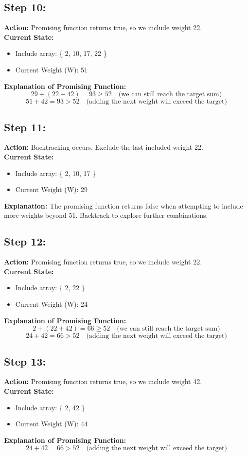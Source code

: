 \documentclass[12pt]{article}
\begin{document}
\subsection*{Step 10:}
\textbf{Action:} Promising function returns true, so we include weight 22. \\
\textbf{Current State:} 
\begin{itemize}
    \item Include array: \{ 2, 10, 17, 22 \}
    \item Current Weight (W): 51
\end{itemize}
\textbf{Explanation of Promising Function:}
\[
29 + (22 + 42) = 93 \geq 52 \quad \text{(we can still reach the target sum)}
\]
\[
51 + 42 = 93 > 52 \quad \text{(adding the next weight will exceed the target)}
\]

\subsection*{Step 11:}
\textbf{Action:} Backtracking occurs. Exclude the last included weight 22. \\
\textbf{Current State:} 
\begin{itemize}
    \item Include array: \{ 2, 10, 17 \}
    \item Current Weight (W): 29
\end{itemize}
\textbf{Explanation:} The promising function returns false when attempting to include more weights beyond 51. Backtrack to explore further combinations.

\subsection*{Step 12:}
\textbf{Action:} Promising function returns true, so we include weight 22. \\
\textbf{Current State:} 
\begin{itemize}
    \item Include array: \{ 2, 22 \}
    \item Current Weight (W): 24
\end{itemize}
\textbf{Explanation of Promising Function:}
\[
2 + (22 + 42) = 66 \geq 52 \quad \text{(we can still reach the target sum)}
\]
\[
24 + 42 = 66 > 52 \quad \text{(adding the next weight will exceed the target)}
\]

\subsection*{Step 13:}
\textbf{Action:} Promising function returns true, so we include weight 42. \\
\textbf{Current State:} 
\begin{itemize}
    \item Include array: \{ 2, 42 \}
    \item Current Weight (W): 44
\end{itemize}
\textbf{Explanation of Promising Function:}
\[
24 + 42 = 66 > 52 \quad \text{(adding the next weight will exceed the target)}
\]
\end{document}
